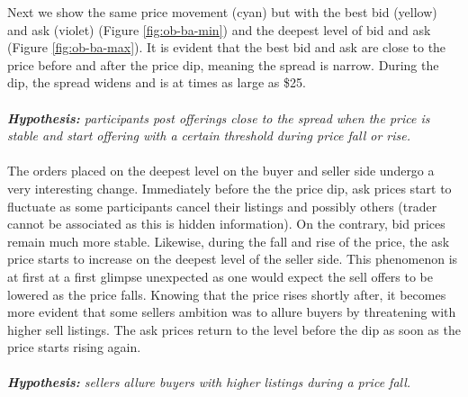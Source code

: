 Next we show the same price movement (cyan) but with the best bid (yellow) and ask (violet) (Figure \ref{fig:ob-ba-min}) and the deepest level of bid and ask (Figure \ref{fig:ob-ba-max}).
It is evident that the best bid and ask are close to the price before and after the price dip, meaning the spread is narrow.
During the dip, the spread widens and is at times as large as \$25.
\\
\\
\textit{\textbf{Hypothesis:} participants post offerings close to the spread when the price is stable and start offering with a certain threshold during price fall or rise.}
\\
\\
The orders placed on the deepest level on the buyer and seller side undergo a very interesting change.
Immediately before the the price dip, ask prices start to fluctuate as some participants cancel their listings and possibly others (trader cannot be associated as this is hidden information).
On the contrary, bid prices remain much more stable.
Likewise, during the fall and rise of the price, the ask price starts to increase on the deepest level of the seller side. 
This phenomenon is at first at a first glimpse unexpected as one would expect the sell offers to be lowered as the price falls.
Knowing that the price rises shortly after, it becomes more evident that some sellers ambition was to allure buyers by threatening with higher sell listings.
The ask prices return to the level before the dip as soon as the price starts rising again.
\\
\\
\textit{\textbf{Hypothesis:} sellers allure buyers with higher listings during a price fall.}
\\
